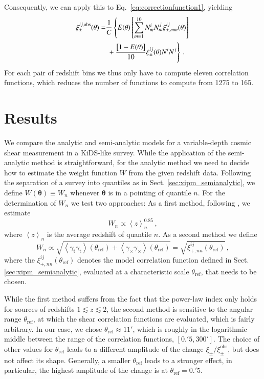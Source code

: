 \documentclass{aa}
\renewcommand{\rm}{\mathrm}
\def\b#1{\bm{#1}}
\def\la{\left<}
\def\ra{\right>}
\begin{document}
Consequently, we can apply this to Eq.~\eqref{eq:correctionfunction1}, yielding
\begin{align}
\xi_{\pm}^{ij,\rm{obs}}(\theta) = & \frac{1}{C}\left\{ E(\theta)\left[\sum_{m=1}^{10} N_m^iN_m^j \xi_{\pm,mm}^{ij}(\theta)\right]\right.\nonumber\\
& \left.\vphantom{\sum_{m=1}^10}+\frac{\big[1-E(\theta)\big]}{10}\xi_\pm^{ij}(\theta)N^iN^j\right\}\, .
\label{eq:correctionfunction2}
\end{align}
For each pair of redshift bins we thus only have to compute eleven correlation functions, which reduces the number of functions to compute from 1275 to 165.


\section{Results}
\label{sec:results}
We compare the analytic and semi-analytic models for a variable-depth cosmic shear measurement in a KiDS-like survey. While the application of the semi-analytic method is straightforward, for the analytic method we need to decide how to estimate the weight function $W$ from the given redshift data. Following the separation of a survey into quantiles as in Sect. \ref{sec:xipm_semianalytic}, we define $W(\b\theta)\equiv W_n$ whenever $\b\theta$ is in a pointing of quantile $n$. For the determination of $W_n$ we test two approaches:
 As a first method, following \citet{2006APh....26...91V,1997A&A...322....1B}, we estimate 
\begin{equation}
W_n \propto \la z \ra _n^{0.85}\, ,
\end{equation}
where $\la z\ra_n$ is the average redshift of quantile $n$. As a second method we define \begin{equation}
W_n \propto \sqrt{ \la\gamma_{\rm{t}}\gamma_{\rm{t}}\ra (\theta_{\rm{ref}}) + \la \gamma_\times\gamma_\times\ra (\theta_{\rm{ref}})} = \sqrt{\xi_{+,nn}^{ij}(\theta_{\rm{ref}})}\, ,
\end{equation}
where the $\xi_{+,nn}^{ij}(\theta_{\rm{ref}})$ denotes the model correlation function defined in Sect. \ref{sec:xipm_semianalytic}, evaluated at a characteristic scale $\theta_{\rm{ref}}$, that needs to be chosen.

While the first method suffers from the fact that the power-law index only holds for sources of redshifts $1\lesssim z \lesssim 2$, the second method is sensitive to the angular range $\theta_{\rm{ref}}$, at which the shear correlation functions are evaluated, which is fairly arbitrary. In our case, we chose $\theta_{\rm{ref}}\approx 11'$, which is roughly in the logarithmic middle between the range of the correlation functions, $[0.\!'5,300']$. The choice of other values for $\theta_{\rm{ref}}$ leads to a different amplitude of the change $\xi_\pm/\xi_\pm^{\rm{obs}}$, but does not affect its shape. Generally, a smaller $\theta_{\rm{ref}}$ leads to a stronger effect, in particular, the highest amplitude of the change is at $\theta_{\rm{ref}}=0.\!'5$.
\end{document}
